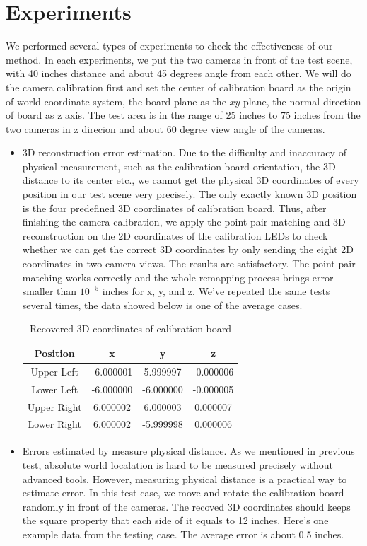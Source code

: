 \documentclass[10pt,twocolumn,letterpaper]{article}
\begin{document}
\section{Experiments}
We performed several types of experiments to 
check the effectiveness of our method. 
In each experiments, we put the two cameras 
in front of the test scene, with 40 inches distance 
and about 45 degrees angle from each other. 
We will do the camera calibration first and set 
the center of calibration board as the origin of 
world coordinate system, the board plane as the $xy$ 
plane, the normal direction of board as z axis. 
The test area is in the range of 25 inches to 75 
inches from the two cameras in z direcion and 
about 60 degree view angle of the cameras.
\begin{itemize}
\item 3D reconstruction error estimation. 
Due to the difficulty and inaccuracy of physical measurement, 
such as the calibration board orientation, the 3D distance 
to its center etc., we cannot get the physical 3D coordinates 
of every position in our test scene very precisely. 
The only exactly known 3D position is the four predefined 
3D coordinates of calibration board. Thus, after finishing 
the camera calibration, we apply the point pair matching 
and 3D reconstruction on the 2D coordinates of the 
calibration LEDs to check whether we can get the correct 
3D coordinates by only sending the eight 2D coordinates 
in two camera views. The results are satisfactory. 
The point pair matching works correctly and the whole 
remapping process brings error smaller than 
$10^{-5}$ inches for x, y, and z. We've repeated the same tests
several times, the data showed below is one of the average cases.
\begin{table}[ht]
\caption{Recovered 3D coordinates of calibration board}
\centering
\begin{tabular}{c c c c}
\hline\hline
Position & x & y & z\\[0.5ex]
\hline
Upper Left & -6.000001& 5.999997& -0.000006 \\
Lower Left &-6.000000& -6.000000& -0.000005\\
Upper Right & 6.000002& 6.000003& 0.000007\\
Lower Right & 6.000002& -5.999998& 0.000006 \\[1ex]
\hline
\end{tabular}
\end{table}
\item Errors estimated by measure physical distance. As we mentioned in previous test, absolute world localation is hard to be measured precisely without advanced tools. However, measuring physical distance is a practical way to estimate error. In this test case, we move and rotate the calibration board randomly in front of the cameras. The recoved 3D coordinates should keeps the square property that each side of it equals to 12 inches. Here's one example data from the testing case. The average error is about 0.5 inches. 

\end{itemize}
\end{document}
